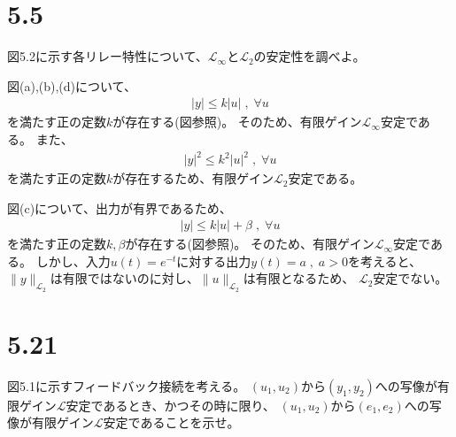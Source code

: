 \documentclass{jsarticle}
\begin{document}
\section*{5.5}
図5.2に示す各リレー特性について、$\mathcal L_\infty$と$\mathcal L_2$の安定性を調べよ。
\vspace{5mm}

図(a),(b),(d)について、
\begin{align}
  |y| \leq k|u|\;,\;\forall u
\end{align}
を満たす正の定数$k$が存在する(図参照)。
そのため、有限ゲイン$\mathcal L_\infty$安定である。
また、
\begin{align}
  |y|^2 \leq k^2 |u|^2\;,\;\forall u 
\end{align}
を満たす正の定数$k$が存在するため、有限ゲイン$\mathcal L_2$安定である。

図(c)について、出力が有界であるため、
\begin{align}
  |y| \leq k|u|+\beta \;,\;\forall u
\end{align}
を満たす正の定数$k,\beta$が存在する(図参照)。
そのため、有限ゲイン$\mathcal L_\infty$安定である。
しかし、入力$u(t) = e^{-t}$に対する出力$y(t) = a\;,\;a>0$を考えると、
$\|y\|_{\mathcal L_2}$は有限ではないのに対し、$\|u\|_{\mathcal L_2}$は有限となるため、
$\mathcal L_2$安定でない。

\newpage

\section*{5.21}
図5.1に示すフィードバック接続を考える。
$(u_1,u_2)$から$(y_1,y_2)$への写像が有限ゲイン$\mathcal L$安定であるとき、かつその時に限り、
$(u_1,u_2)$から$(e_1,e_2)$への写像が有限ゲイン$\mathcal L$安定であることを示せ。
\vspace{5mm}
\end{document}
